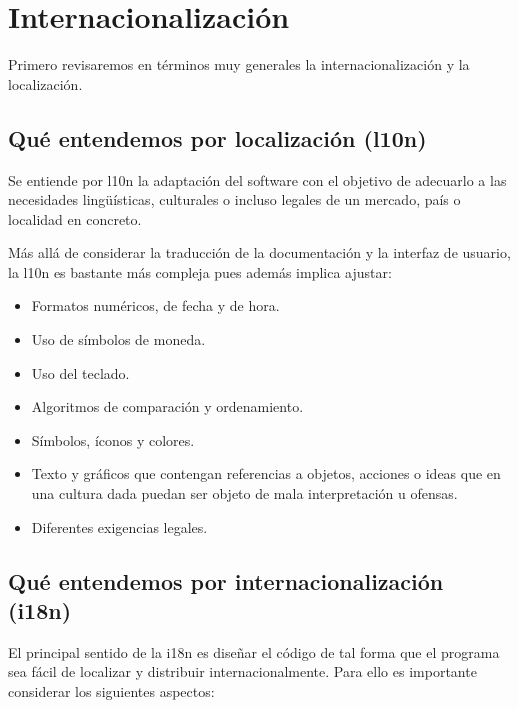 
\section{Internacionalización}\label{i18n:internacionalizacion}

Primero revisaremos en términos muy generales la internacionalización y la localización.

\subsection{Qué entendemos por localización (l10n)}\label{i18n:que-entendemos-l10n}
Se entiende por l10n la adaptación del software con el objetivo de adecuarlo a las necesidades lingüísticas, culturales o incluso legales de un mercado, país o localidad en concreto.

Más allá de considerar la traducción de la documentación y la interfaz de usuario, la l10n es bastante más compleja pues además implica ajustar:
\begin{itemize}
	\item Formatos numéricos, de fecha y de hora.
	\item Uso de símbolos de moneda.
	\item Uso del teclado.
	\item Algoritmos de comparación y ordenamiento.
	\item Símbolos, íconos y colores.
	\item Texto y gráficos que contengan referencias a objetos, acciones o ideas que en una cultura dada puedan ser objeto de mala interpretación u ofensas.
	\item Diferentes exigencias legales.
\end{itemize}

\subsection{Qué entendemos por internacionalización (i18n)}\label{i18n:que-entendemos-i18n}

El principal sentido de la i18n es diseñar el código de tal forma que el programa sea fácil de localizar y distribuir internacionalmente. Para ello es importante considerar los siguientes aspectos:


